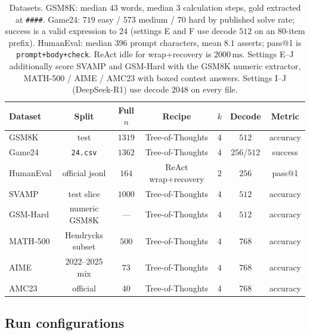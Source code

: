 \documentclass[11pt,a4paper]{article}
\begin{document}
\begin{table}[h]
\centering
\small
\begin{tabular}{@{}lcccccc@{}}
\toprule
Dataset & Split & Full $n$ & Recipe & $k$ & Decode & Metric \\
\midrule
GSM8K & test & $1319$ & Tree-of-Thoughts & $4$ & $512$ & accuracy \\
Game24 & \texttt{24.csv} & $1362$ & Tree-of-Thoughts & $4$ & $256$/$512$ & success \\
HumanEval & official jsonl & $164$ & ReAct wrap+recovery & $2$ & $256$ & pass@1 \\
SVAMP & test slice & $1000$ & Tree-of-Thoughts & $4$ & $512$ & accuracy \\
GSM-Hard & numeric GSM8K & --- & Tree-of-Thoughts & $4$ & $512$ & accuracy \\
MATH-500 & Hendrycks subset & $500$ & Tree-of-Thoughts & $4$ & $768$ & accuracy \\
AIME & 2022--2025 mix & $73$ & Tree-of-Thoughts & $4$ & $768$ & accuracy \\
AMC23 & official & $40$ & Tree-of-Thoughts & $4$ & $768$ & accuracy \\
\bottomrule
\end{tabular}
\caption{Datasets.
GSM8K: median $43$ words, median $3$ calculation steps, gold extracted at \texttt{\#\#\#\#}.
Game24: $719$ easy / $573$ medium / $70$ hard by published solve rate; success is a valid expression to $24$ (settings E and F use decode $512$ on an $80$-item prefix).
HumanEval: median $396$ prompt characters, mean $8.1$ asserts; pass@1 is \texttt{prompt+body+check}.
ReAct idle for wrap+recovery is $2000\,\mathrm{ms}$.
Settings E--J additionally score SVAMP and GSM-Hard with the GSM8K numeric extractor, MATH-500 / AIME / AMC23 with boxed contest answers.
Settings I--J (DeepSeek-R1) use decode $2048$ on every file.}
\end{table}

\subsection{Run configurations}
\end{document}
